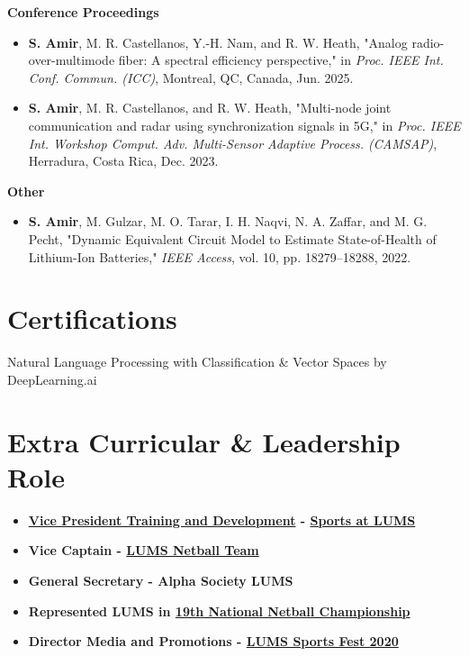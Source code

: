 \documentclass[11pt,a4paper,sans]{moderncv}        %
\begin{document}
\textbf{Conference Proceedings}
\begin{itemize}
    \item [C1] \textbf{S. Amir}, M. R. Castellanos, Y.-H. Nam, and R. W. Heath, "Analog radio-over-multimode fiber: A spectral efficiency perspective," in \textit{Proc. IEEE Int. Conf. Commun. (ICC)}, Montreal, QC, Canada, Jun. 2025.
    \item [C2] \textbf{S. Amir}, M. R. Castellanos, and R. W. Heath, "Multi-node joint communication and radar using synchronization signals in 5G," in \textit{Proc. IEEE Int. Workshop Comput. Adv. Multi-Sensor Adaptive Process. (CAMSAP)}, Herradura, Costa Rica, Dec. 2023.
\end{itemize}

\textbf{Other}
\begin{itemize}
    \item \textbf{S. Amir}, M. Gulzar, M. O. Tarar, I. H. Naqvi, N. A. Zaffar, and M. G. Pecht, "Dynamic Equivalent Circuit Model to Estimate State-of-Health of Lithium-Ion Batteries," \textit{IEEE Access}, vol. 10, pp. 18279--18288, 2022.
\end{itemize}


\section{Certifications}
Natural Language Processing with Classification \& Vector Spaces by DeepLearning.ai



\section{Extra Curricular \& Leadership Role}
\begin{itemize}
    \item \textbf{\href{https://www.facebook.com/sportsatlums/photos/3004363542935202}{Vice President Training and Development} - \href{https://slums.lums.edu.pk/}{Sports at LUMS}}
    \item \textbf{Vice Captain - \href{https://www.instagram.com/lumsnetballteam/}{LUMS Netball Team}}
    \item \textbf{General Secretary - Alpha Society LUMS}
    \item \textbf{Represented LUMS in \href{https://www.khilari.com.pk/news/6850/19th-national-netball-championship-from-today}{19th National Netball Championship}}
    \item \textbf{Director Media and Promotions - \href{https://www.facebook.com/LUMS.sportsfest}{LUMS Sports Fest 2020}}
\end{itemize}


\end{document}
